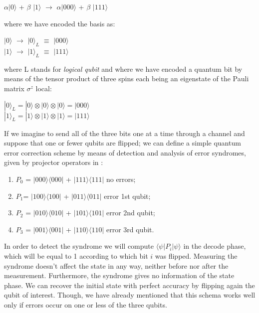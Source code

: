 \documentclass{Configuration_Files/PoliMi3i_thesis}
\begin{document}
\begin{center}
	$\alpha |0 \rangle$ + $\beta$ $|1 \rangle$ $\rightarrow$ $\alpha |000 \rangle$ + $\beta$ $|111 \rangle$
\end{center}

where we have encoded the basis as:

\begin{center}
	$|0 \rangle$ $\rightarrow$ $|0 \rangle_L$ $\equiv$ $|000 \rangle$   \\
	$|1 \rangle$ $\rightarrow$ $|1 \rangle_L$ $\equiv$ $|111 \rangle$
\end{center}

where L stands for {\it logical qubit} and where we have encoded a quantum bit by means of the tensor product of three spins each being an eigenstate of the Pauli matrix $\sigma^z$ local: 

\begin{center}
	$|0\rangle_L = |0\rangle \otimes |0\rangle \otimes |0\rangle = |000\rangle$ \\
	$|1\rangle_L = |1\rangle \otimes |1\rangle \otimes |1\rangle = |111\rangle$
\end{center}

If we imagine to send all of the three bits one at a time through a channel and suppose that one or fewer qubits are flipped; we can define a simple quantum error correction scheme by means of detection and analysis of error syndromes, given by projector operators in \cite{Nie06}:

\begin{enumerate}
	\item  $P_0$ = $|000 \rangle \langle 000|$ + $|111 \rangle \langle 111|$ no errors;
	\item $P_1$= $|100 \rangle \langle 100|$ + $|011 \rangle \langle 011|$ error 1st qubit;
	\item $P_2$ = $|010 \rangle \langle 010|$ + $|101 \rangle \langle 101|$ error 2nd qubit;
	\item $P_3$ = $|001 \rangle \langle 001|$ + $|110 \rangle \langle 110|$ error 3rd qubit.
\end{enumerate}

In order to detect the syndrome we will compute $\langle \psi| P_i | \psi \rangle $ in the decode phase, which will be equal to 1 according to which bit $i$ was flipped.
Measuring the syndrome doesn't affect the state in any way, neither before nor after the measurement. Furthermore, the syndrome gives no information of the state phase. We can recover the initial state with perfect accuracy by flipping again the qubit of interest. Though, we have already mentioned that this schema works well only if errors occur on one or less of the three qubits.\newline
 
\end{document}
